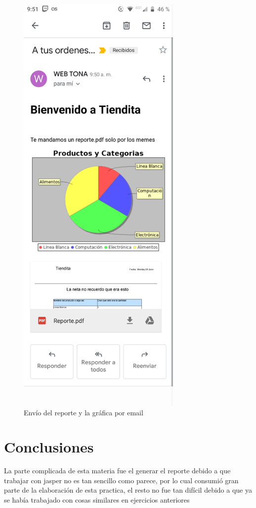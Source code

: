 \documentclass[a4paper,12pt]{article}
\begin{document}
\begin{figure}[H]
\begin{center}
 \includegraphics[width=8cm]{celular.png}
 \caption{Envío del reporte y la gráfica por email}
 \label{fig:celular}
\end{center}
\end{figure}

\section{Conclusiones}
La parte complicada de esta materia fue el generar el reporte debido a que 
trabajar con jasper no es tan sencillo como parece, por lo cual consumió gran 
parte de la elaboración de esta practica, el resto no fue tan difícil debido a 
que ya se había trabajado con cosas similares en ejercicios anteriores
\end{document}
